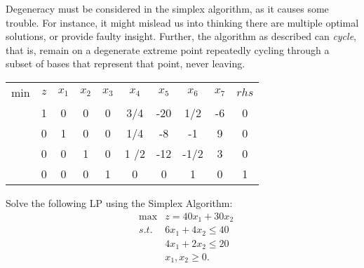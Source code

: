 Degeneracy must be considered in the simplex algorithm, as it causes some trouble.  For instance, it might mislead us into thinking there are multiple optimal solutions, or provide faulty insight.  Further, the algorithm as described can {\it cycle}, that is, remain on a degenerate extreme point repeatedly cycling through a subset of bases that represent that point, never leaving. 

\begin{center} \begin{tabular} {c|c|c|c|c|c|c|c|c|c|} \cline{2-10}
min &$z$	& $x_1$ & $x_2$ & $x_3$	& $x_4$	&  $x_5 $& $x_6$ & $x_7$ & $rhs$ \\ \cline{2-10}
       &1		& 0 		  & 0         &	 0 	    &	  3/4     &   -20 & 1/2 & -6  &     0    \\ \cline{2-10}
       &0		&	 1       &	    0   &	 0 			&	  1/4 		&	-8 & -1 &   9 &   0	  \\
       &0		&	 0     &	    1      &	 0 		&	  1 /2		&	 -12 & -1/2 & 3 & 0   \\ 
       &0		&	 0     &	    0      &	 1 		&	  0		&	 0 & 1 & 0 &1   \\ \cline{2-10}
\end{tabular} \end{center}


\bigskip  Solve the following LP using the Simplex Algorithm:
\begin{eqnarray}
& \max  & z = 40x_1 + 30x_2 \nonumber \\
& s.t. & 6x_1 + 4x_2 \le 40 \nonumber \\
&      & 4x_1 + 2x_2 \le 20 \nonumber \\
&      & x_1, x_2 \ge 0. \nonumber
\end{eqnarray}

